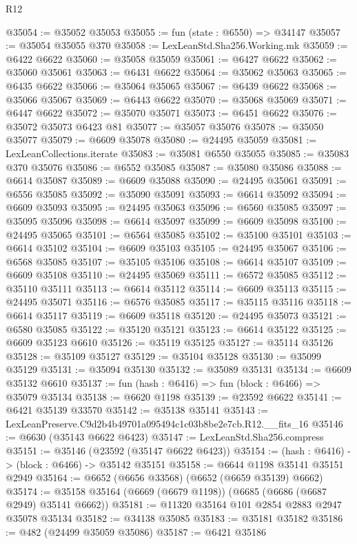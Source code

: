 \begin{lexlean}{R12}
\begin{coremodule}
@35054 := @35052 @35053
@35055 := fun (state : @6550) => @34147
@35057 := @35054 @35055 @370
@35058 := LexLeanStd.Sha256.Working.mk
@35059 := @6422 @6622
@35060 := @35058 @35059
@35061 := @6427 @6622
@35062 := @35060 @35061
@35063 := @6431 @6622
@35064 := @35062 @35063
@35065 := @6435 @6622
@35066 := @35064 @35065
@35067 := @6439 @6622
@35068 := @35066 @35067
@35069 := @6443 @6622
@35070 := @35068 @35069
@35071 := @6447 @6622
@35072 := @35070 @35071
@35073 := @6451 @6622
@35076 := @35072 @35073 @6423 @81
@35077 := @35057 @35076
@35078 := @35050 @35077
@35079 := @6609 @35078
@35080 := @24495 @35059
@35081 := LexLeanCollections.iterate
@35083 := @35081 @6550 @35055
@35085 := @35083 @370 @35076
@35086 := @6552 @35085
@35087 := @35080 @35086
@35088 := @6614 @35087
@35089 := @6609 @35088
@35090 := @24495 @35061
@35091 := @6556 @35085
@35092 := @35090 @35091
@35093 := @6614 @35092
@35094 := @6609 @35093
@35095 := @24495 @35063
@35096 := @6560 @35085
@35097 := @35095 @35096
@35098 := @6614 @35097
@35099 := @6609 @35098
@35100 := @24495 @35065
@35101 := @6564 @35085
@35102 := @35100 @35101
@35103 := @6614 @35102
@35104 := @6609 @35103
@35105 := @24495 @35067
@35106 := @6568 @35085
@35107 := @35105 @35106
@35108 := @6614 @35107
@35109 := @6609 @35108
@35110 := @24495 @35069
@35111 := @6572 @35085
@35112 := @35110 @35111
@35113 := @6614 @35112
@35114 := @6609 @35113
@35115 := @24495 @35071
@35116 := @6576 @35085
@35117 := @35115 @35116
@35118 := @6614 @35117
@35119 := @6609 @35118
@35120 := @24495 @35073
@35121 := @6580 @35085
@35122 := @35120 @35121
@35123 := @6614 @35122
@35125 := @6609 @35123 @6610
@35126 := @35119 @35125
@35127 := @35114 @35126
@35128 := @35109 @35127
@35129 := @35104 @35128
@35130 := @35099 @35129
@35131 := @35094 @35130
@35132 := @35089 @35131
@35134 := @6609 @35132 @6610
@35137 := fun (hash : @6416) => fun (block : @6466) => @35079 @35134
@35138 := @6620 @1198
@35139 := @23592 @6622
@35141 := @6421 @35139 @33570
@35142 := @35138 @35141
@35143 := LexLeanPreserve.C9d2b4b49701a095494c1c03b8be2e7cb.R12.__fits_16
@35146 := @6630 (@35143 @6622 @6423)
@35147 := LexLeanStd.Sha256.compress
@35151 := @35146 (@23592 (@35147 @6622 @6423))
@35154 := (hash : @6416) -> (block : @6466) -> @35142 @35151
@35158 := @6644 @1198 @35141 @35151 @2949
@35164 := @6652 (@6656 @33568) (@6652 (@6659 @35139) @6662)
@35174 := @35158 @35164 (@6669 (@6679 @1198)) (@6685 (@6686 (@6687 @2949) @35141 @6662))
@35181 := @11320 @35164 @101 @2854 @2883 @2947 @35078 @35134
@35182 := @34138 @35085
@35183 := @35181 @35182
@35186 := @482 (@24499 @35059 @35086)
@35187 := @6421 @35186

\end{coremodule}
\end{lexlean}
